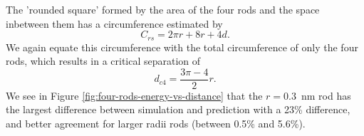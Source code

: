 \documentclass[letterpaper,twocolumn,amsmath,amssymb,prb]{revtex4-1}
\newcommand{\red}[1]{{\bf \color{red} #1}}
\newcommand{\fixme}[1]{\red{[#1]}}
\begin{document}
The 'rounded square' formed by the area of the four rods and the space
inbetween them has a circumference estimated by
\begin{equation}
C_{rs} = 2 \pi r + 8r + 4d.
\end{equation}
We again equate this circumference with the total circumference of
only the four rods, which results in a critical separation of
\begin{equation}
d_{c4} = \frac{3 \pi - 4}{2} r. \label{criticalfourrods}
\end{equation}
We see in Figure \ref{fig:four-rods-energy-vs-distance} that the $r = 0.3$~nm
rod has the largest difference between simulation and prediction with
a 23\% difference, and better agreement for larger radii rods (between 0.5\% and 5.6\%).

% 
% 
% 
%
\end{document}

